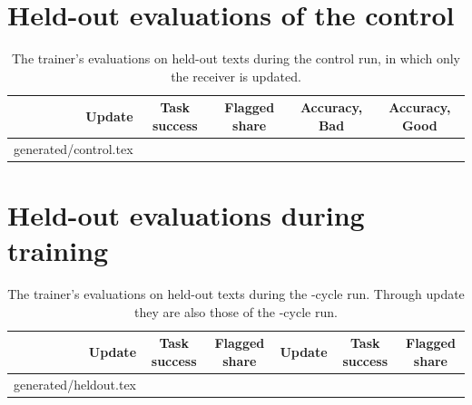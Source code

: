 \documentclass[11pt,a4paper]{article}
\makeatletter
\newcommand{\rows}[1]{\@@input generated/#1.tex }
\makeatother
\begin{document}
\section{Held-out evaluations of the control}

\begin{table}[H]
\centering\small
\caption{The trainer's evaluations on \HeldTexts{} held-out texts during the control run, in which only the
receiver is updated.}
\label{tab:control}
\begin{tabular}{rcccc}
\toprule
Update & Task success & Flagged share & Accuracy, Bad & Accuracy, Good \\
\midrule
\rows{control}
\bottomrule
\end{tabular}
\end{table}

\section{Held-out evaluations during training}

\begin{table}[H]
\centering\small
\caption{The trainer's evaluations on \HeldTexts{} held-out texts during the \LongCycles{}-cycle run.
Through update \ShortUpdates{} they are also those of the \ShortCycles{}-cycle run.}
\label{tab:heldout}
\begin{tabular}{rcc@{\hskip 2.5em}rcc}
\toprule
Update & Task success & Flagged share & Update & Task success & Flagged share \\
\midrule
\rows{heldout}
\bottomrule
\end{tabular}
\end{table}
\end{document}
